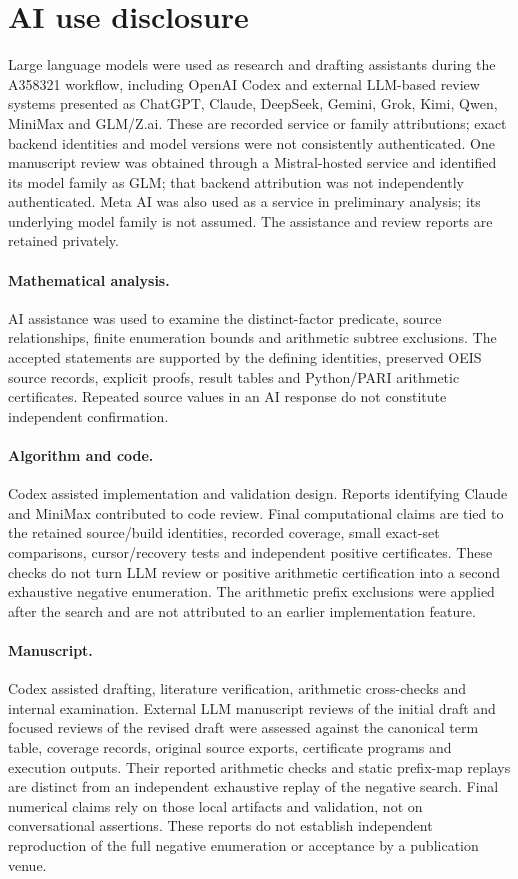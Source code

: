 \documentclass[11pt]{article}
\theoremstyle{remark}
\begin{document}
\section*{AI use disclosure}
Large language models were used as research and drafting assistants during
the A358321 workflow, including OpenAI Codex and external LLM-based review
systems presented as ChatGPT, Claude, DeepSeek, Gemini, Grok, Kimi, Qwen,
MiniMax and GLM/Z.ai. These are recorded service or family attributions;
exact backend identities and model versions were not consistently
authenticated. One manuscript review was obtained through a Mistral-hosted
service and identified its model family as GLM; that backend attribution
was not independently authenticated. Meta AI was also used as a service in preliminary analysis;
its underlying model family is not assumed. The assistance and review
reports are retained privately.

\paragraph{Mathematical analysis.}
AI assistance was used to examine the distinct-factor predicate, source
relationships, finite enumeration bounds and arithmetic subtree exclusions.
The accepted statements are supported by the defining identities, preserved
OEIS source records, explicit proofs, result tables and Python/PARI arithmetic
certificates. Repeated source values in an AI response do not constitute
independent confirmation.

\paragraph{Algorithm and code.}
Codex assisted implementation and validation design. Reports identifying
Claude and MiniMax contributed to code review. Final computational claims
are tied to the retained source/build identities, recorded coverage, small
exact-set comparisons, cursor/recovery tests and independent positive
certificates. These checks do not turn LLM review or positive arithmetic
certification into a second exhaustive negative enumeration. The arithmetic
prefix exclusions were applied after the search and are not attributed to
an earlier implementation feature.

\paragraph{Manuscript.}
Codex assisted drafting, literature verification, arithmetic cross-checks and
internal examination. External LLM manuscript reviews of the initial draft
and focused reviews of the revised draft were assessed against the canonical
term table, coverage records, original
source exports, certificate programs and execution outputs. Their reported
arithmetic checks and static prefix-map replays are distinct from an
independent exhaustive replay of the negative search. Final numerical
claims rely on those local artifacts and validation, not on conversational
assertions. These reports do not establish independent reproduction of the full
negative enumeration or acceptance by a publication venue.
\end{document}
